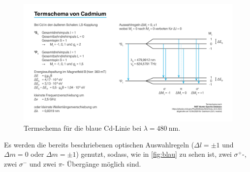 \begin{figure}[H]
    \centering
    \includegraphics[width=\textwidth]{graphics/Termschema_Cd_tuerkis.png}
    \caption{Termschema für die blaue Cd-Linie bei $\lambda = \SI{480}{\nano\meter}$. \cite{blau}}
    \label{fig:blau}
\end{figure}

Es werden die bereits beschriebenen optischen Auswahlregeln ($\Delta l = \pm 1$  und $\Delta m = 0$ oder $\Delta m = \pm 1$) genutzt, sodass, wie in \autoref{fig:blau} zu sehen ist, zwei $\sigma^{+}$-, zwei $\sigma^{-}$ und zwei $\pi$- Übergänge möglich sind.